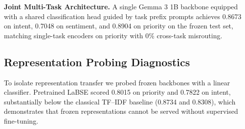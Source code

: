 \textbf{Joint Multi-Task Architecture.} A single Gemma 3 1B backbone equipped with a shared classification head guided by task prefix prompts achieves 0.8673 on intent, 0.7048 on sentiment, and 0.8904 on priority on the frozen test set, matching single-task encoders on priority with 0\% cross-task misrouting.

\subsection{Representation Probing Diagnostics}

To isolate representation transfer we probed frozen backbones with a linear
classifier. Pretrained LaBSE scored 0.8015 on priority and 0.7822 on intent,
substantially below the classical TF--IDF baseline (0.8734 and 0.8308), which
demonstrates that frozen representations cannot be served without supervised
fine-tuning.
